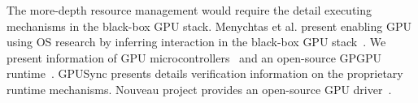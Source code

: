 The more-depth resource management would require the detail executing mechanisms in the black-box GPU stack.
Menychtas et al. present enabling GPU using OS research by inferring interaction in the black-box GPU stack~\cite{menychtas2013enabling}.
We present information of GPU microcontrollers~\cite{fujii:apsys2013} and an open-source GPGPU runtime~\cite{kato:gdev}.
GPUSync presents details verification information on the proprietary runtime mechanisms.
Nouveau project provides an open-source GPU driver~\cite{nouveau}.


%
%


